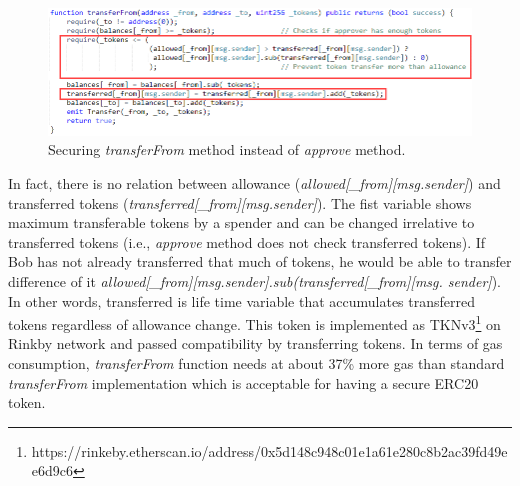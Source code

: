 \begin{figure}[t]
	\centering
	\includegraphics[width=1.0\linewidth]{figures/multiple_withdrawal_31.png}
	\caption{Securing \textit{transferFrom} method instead of \textit{approve} method.}
\end{figure}
\noindent In fact, there is no relation between allowance (\textit{allowed[\_from][msg.sender]}) and transferred tokens (\textit{transferred[\_from][msg.sender]}). The fist variable shows maximum transferable tokens by a spender and can be changed irrelative to transferred tokens (i.e., \textit{approve} method does not check transferred tokens). If Bob has not already transferred that much of tokens, he would be able to transfer difference of it \textit{allowed[\_from][msg.sender].sub(transferred[\_from][msg. sender]}). In other words, transferred is life time variable that accumulates transferred tokens regardless of allowance change. This token is implemented as TKNv3\footnote{https://rinkeby.etherscan.io/address/0x5d148c948c01e1a61e280c8b2ac39\newline fd49ee6d9c6} on Rinkby network and passed compatibility by transferring tokens. In terms of gas consumption, \textit{transferFrom} function needs at about 37\% more gas than standard \textit{transferFrom} implementation which is acceptable for having a secure ERC20 token.